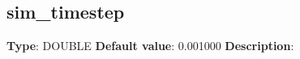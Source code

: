 \subsection*{sim_timestep}
\textbf{Type}: DOUBLE\newline
\textbf{Default value}: 0.001000\newline
\textbf{Description}: